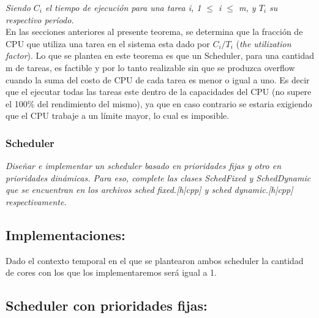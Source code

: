 \documentclass[a4paper]{article}
\begin{document}
\textit{Siendo $C_i$ el tiempo de ejecuci\'on para una tarea i, 1 $\leq$ i $\leq$ m, y $T_i$ su respectivo per\'iodo.}\\

En las secciones anteriores al presente teorema, se determina que la fracción de CPU que utiliza una tarea en el sistema esta dado por $C_i/T_i$ (\textit{the utilization factor}). Lo que se plantea en este teorema es que un Scheduler, para una cantidad m de tareas, es factible y por lo tanto realizable sin que se produzca overflow cuando la suma del costo de CPU de cada tarea es menor o igual a uno. Es decir que el ejecutar todas las tareas este dentro de la capacidades del CPU (no supere el 100\% del rendimiento del mismo), ya que en caso contrario se estaria exigiendo que el CPU trabaje a un l\'imite mayor, lo cual es imposible. \\




\subsubsection{Scheduler}
\textit{Dise\~nar e implementar un scheduler basado en prioridades fijas y otro en prioridades din\'amicas. Para eso, complete las clases SchedFixed y SchedDynamic que se encuentran en los archivos sched fixed.[h|cpp] y sched dynamic.[h|cpp] respectivamente.}\\

\subsection*{Implementaciones:}

Dado el contexto temporal en el que se plantearon ambos scheduler la cantidad de cores con los que los implementaremos será igual a 1.

\subsection*{Scheduler con prioridades fijas:}
\end{document}
